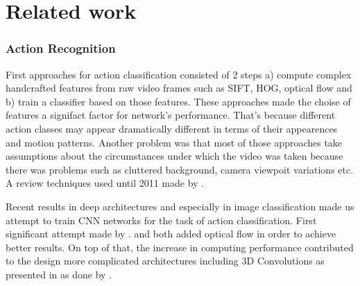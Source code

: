 \documentclass{report}
\begin{document}
\chapter{Related work}




\subsection{Action Recognition}
First approaches for action classification consisted of 2 steps a) compute complex handcrafted features from raw video frames
such as SIFT, HOG, optical flow and b) train a classifier based on those features. These approaches made the choise of
features a signifact factor for network's performance. That's because different action classes may appear dramatically
different in terms of their appearences and motion patterns. Another problem was that most of those approaches take
assumptions about the circumstances under which the video was taken because there was problems such as cluttered
background, camera viewpoit variations etc. A review techniques used until 2011 made by \cite{Aggarwal:2011:HAA:1922649.1922653}.

Recent results in deep architectures and especially in image classification made us attempt to train CNN networks for
the task of action classification. First significant attempt made by \cite{6909619}.  %
 \cite{simonyan2014two} and \cite{DBLP:journals/corr/FeichtenhoferPZ16} both added optical flow in order to achieve better results.
On top of that, the increase  in computing performance contributed to the design more complicated architectures including
3D Convolutions as presented in \cite{6165309} as done by \cite{DBLP:journals/corr/TranBFTP14}.
\end{document}
